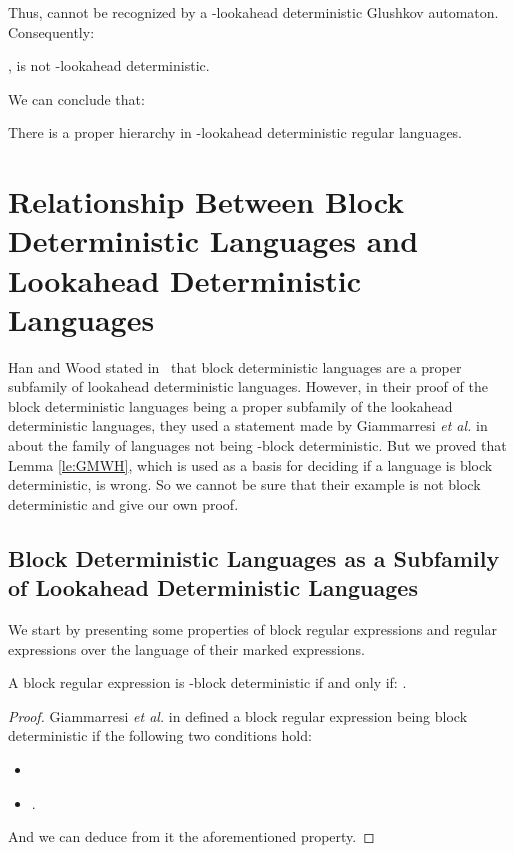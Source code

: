 \documentclass{llncs}
\begin{document}
	Thus,  cannot be recognized by a -lookahead deterministic Glushkov automaton.
	Consequently:
	
\begin{proposition}\label{prop:Aj_non_j_ld}
	,  is not -lookahead deterministic.
\end{proposition}

	We can conclude that:
\begin{theorem}
	There is a proper hierarchy in -lookahead deterministic regular languages.
\end{theorem}


\section{Relationship Between Block Deterministic Languages and Lookahead Deterministic Languages}\label{se:inclusion_kbd_kld}

	Han and Wood stated in~\cite{HW08} that block deterministic languages are a proper subfamily of lookahead deterministic languages.
	However, in their proof of the block deterministic languages being a proper subfamily of the lookahead deterministic languages, they used a statement made by Giammarresi \emph{et al.} in~\cite{GMW01} about the family of languages  not being -block deterministic.
	But we proved that Lemma \ref{le:GMWH}, which is used as a basis for deciding if a language is block deterministic, is wrong.
	So we cannot be sure that their example is not block deterministic and give our own proof.

\subsection{Block Deterministic Languages as a Subfamily of Lookahead Deterministic Languages}

	We start by presenting some properties of block regular expressions and regular expressions over the language of their marked expressions.
	

\begin{lemma}
	A block regular expression  is -block deterministic if and only if: 
	.
\end{lemma}
\begin{proof}
	Giammarresi \emph{et al.} in \cite{GMW01} defined a block regular expression  being block deterministic if the following two conditions hold:
	\begin{itemize}
		\item 
		\item .
	\end{itemize}
	And we can deduce from it the aforementioned property.
\end{proof}
\end{document}
